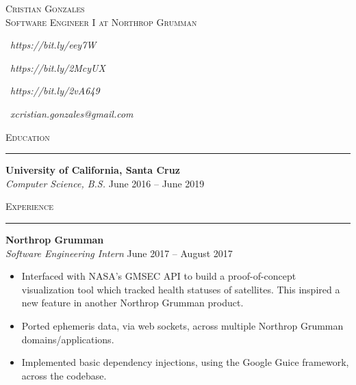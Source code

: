 \documentclass{res}
\begin{document}
\begin{resume}

\begin{center}
\textsc{{\Huge Cristian Gonzales}}\\
\vspace{1mm}
\textsc{\large Software Engineer I at Northrop Grumman}\\
\vspace{1mm}
\end{center}

\begin{multicols}{4}
\begin{center}
\faLinkedinSquare\ 
\textit{https://bit.ly/eey7W}
\end{center}
\columnbreak
\begin{center}
\faGithub\ 
\textit{https://bit.ly/2McyUX}
\end{center}
\columnbreak
\begin{center}
\faGlobe\ 
\textit{https://bit.ly/2vA649}
\end{center}
\columnbreak
\faEnvelope\ 
\textit{xcristian.gonzales@gmail.com}
\end{multicols}

\vspace{-3mm}

\textsc{{\Large Education}}
\vspace{0.5mm}
\hrule width18.5cm
\textbf{University of California, Santa Cruz}\\
\textit{Computer Science, B.S.}
\hfill
June 2016 -- June 2019\\
\vspace{-4mm}

\textsc{{\Large Experience}}
\vspace{0.5mm}
\hrule width18.5cm
\textbf{Northrop Grumman}\\
\textit{Software Engineering Intern}
\hfill
June 2017 -- August 2017\\[1mm]
	\begin{itemize}
		\vspace{-3mm}
		\item Interfaced with NASA's GMSEC API to build a proof-of-concept visualization tool which tracked health statuses of satellites. This inspired a new feature in another Northrop Grumman product.
		\item Ported ephemeris data, via web sockets, across multiple Northrop Grumman domains/applications.
		\item Implemented basic dependency injections, using the Google Guice framework, across the codebase.
	\end{itemize}


\end{resume}
\end{document}
